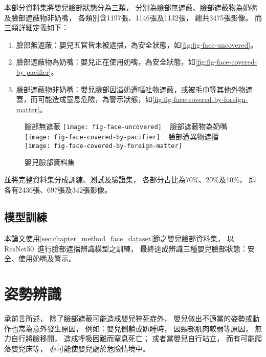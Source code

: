 \documentclass[class=NCU_thesis, crop=false]{standalone}
\begin{document}
本部分資料集將嬰兒臉部狀態分為三類，
分別為臉部無遮蔽、臉部遮蔽物為奶嘴及臉部遮蔽物非奶嘴，
各類別含1197張、1146張及1132張，
總共3475張影像。
而三類詳細定義如下：
\begin{enumerate}
    \item 臉部無遮蔽：嬰兒五官皆未被遮擋，為安全狀態，如\cref{fig:fig-face-uncovered}。
    \item 臉部遮蔽物為奶嘴：嬰兒正在使用奶嘴，為安全狀態，如\cref{fig:fig-face-covered-by-pacifier}。
    \item 臉部遮蔽物非奶嘴：嬰兒臉部因溢奶遭嘔吐物遮蔽，或被毛巾等其他外物遮蓋，而可能造成窒息危險，為警示狀態，如\cref{fig:fig-face-covered-by-foreign-matter}。
\end{enumerate}
\begin{figure}[!hbt]
    \centering
    \subcaptionbox
        {臉部無遮蔽
        \label{fig:fig-face-uncovered}}
        {\texttt{[image: fig-face-uncovered]}}
    ~
    \subcaptionbox
        {臉部遮蔽物為奶嘴
        \label{fig:fig-face-covered-by-pacifier}}
        {\texttt{[image: fig-face-covered-by-pacifier]}}
    ~
    \subcaptionbox
        {臉部遭異物遮擋
        \label{fig:fig-face-covered-by-foreign-matter}}
        {\texttt{[image: fig-face-covered-by-foreign-matter]}}
    \caption{嬰兒臉部資料集}
    \label{fig:fig-face-dataset}
\end{figure}

並將完整資料集分成訓練、測試及驗證集，
各部分占比為70\%、20\%及10\%，
即各有2436張、697張及342張影像。

\subsection{模型訓練}
本論文使用\ref{sec:chapter_method_face_dataset}節之嬰兒臉部資料集，
以ResNet50~\cite{he_deep_2016}進行臉部遮擋辨識模型之訓練，
最終達成辨識三種嬰兒臉部狀態：安全、使用奶嘴及警示。

\section{姿勢辨識}
\label{sec:chapter_method_posture}
承前言所述，
除了臉部遮蔽可能造成嬰兒猝死症外，
嬰兒做出不適當的姿勢或動作也常為意外發生原因，
例如：嬰兒側躺或趴睡時，
因頸部肌肉較弱等原因，
無力自行將臉移開，
造成呼吸困難而窒息死亡；
或者當嬰兒自行站立，
而有可能爬落嬰兒床等，
亦可能使嬰兒處於危險情境中。
\end{document}
